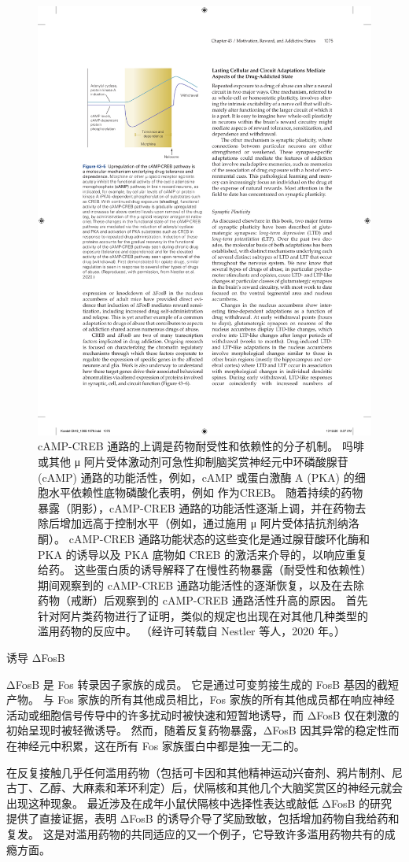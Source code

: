\begin{figure}[htbp]
	\centering
	\includegraphics[width=0.5\linewidth]{chap43/fig_43_5}
	\caption{cAMP-CREB 通路的上调是药物耐受性和依赖性的分子机制。 吗啡或其他 μ 阿片受体激动剂可急性抑制脑奖赏神经元中环磷酸腺苷 (cAMP) 通路的功能活性，例如，cAMP 或蛋白激酶 A (PKA) 的细胞水平依赖性底物磷酸化表明，例如 作为CREB。 随着持续的药物暴露（阴影），cAMP-CREB 通路的功能活性逐渐上调，并在药物去除后增加远高于控制水平（例如，通过施用 μ 阿片受体拮抗剂纳洛酮）。 cAMP-CREB 通路功能状态的这些变化是通过腺苷酸环化酶和 PKA 的诱导以及 PKA 底物如 CREB 的激活来介导的，以响应重复给药。 这些蛋白质的诱导解释了在慢性药物暴露（耐受性和依赖性）期间观察到的 cAMP-CREB 通路功能活性的逐渐恢复，以及在去除药物（戒断）后观察到的 cAMP-CREB 通路活性升高的原因。 首先针对阿片类药物进行了证明，类似的规定也出现在对其他几种类型的滥用药物的反应中。 （经许可转载自 Nestler 等人，2020 年。）}
	\label{fig:43_5}
\end{figure}


诱导 ΔFosB

ΔFosB 是 Fos 转录因子家族的成员。
它是通过可变剪接生成的 FosB 基因的截短产物。
与 Fos 家族的所有其他成员相比，Fos 家族的所有其他成员都在响应神经活动或细胞信号传导中的许多扰动时被快速和短暂地诱导，而 ΔFosB 仅在刺激的初始呈现时被轻微诱导。
然而，随着反复药物暴露，ΔFosB 因其异常的稳定性而在神经元中积累，这在所有 Fos 家族蛋白中都是独一无二的。


在反复接触几乎任何滥用药物（包括可卡因和其他精神运动兴奋剂、鸦片制剂、尼古丁、乙醇、大麻素和苯环利定）后，伏隔核和其他几个大脑奖赏区的神经元就会出现这种现象。
最近涉及在成年小鼠伏隔核中选择性表达或敲低 ΔFosB 的研究提供了直接证据，表明 ΔFosB 的诱导介导了奖励致敏，包括增加药物自我给药和复发。
这是对滥用药物的共同适应的又一个例子，它导致许多滥用药物共有的成瘾方面。


